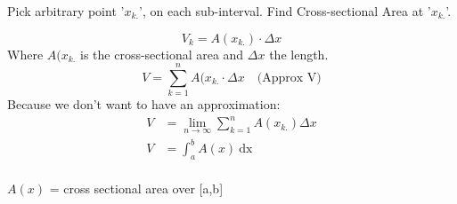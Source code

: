 \documentclass{book}
\begin{document}
Pick arbitrary point '$x_{k.}$', on each sub-interval. Find Cross-sectional Area at '$x_{k.}$'.

\[ V_k=A(x_{k.})\cdot \Delta x \] 
Where $A(x_{k.}$ is the cross-sectional area and $\Delta x$ the length.
\[V=\sum^n_{k=1} A(x_{k.}\cdot \Delta x \quad  \text{(Approx V)} \] 
Because we don't want to have an approximation:
\begin{align*}
    V&= \lim_{n\to\infty} \sum^n_{k=1}A(x_{k.})\Delta x \\
    V&= \int_{a}^{b} A(x) \ \text{dx}  \\
\end{align*}

$A(x)$ = cross sectional area over [a,b]

\end{document}
